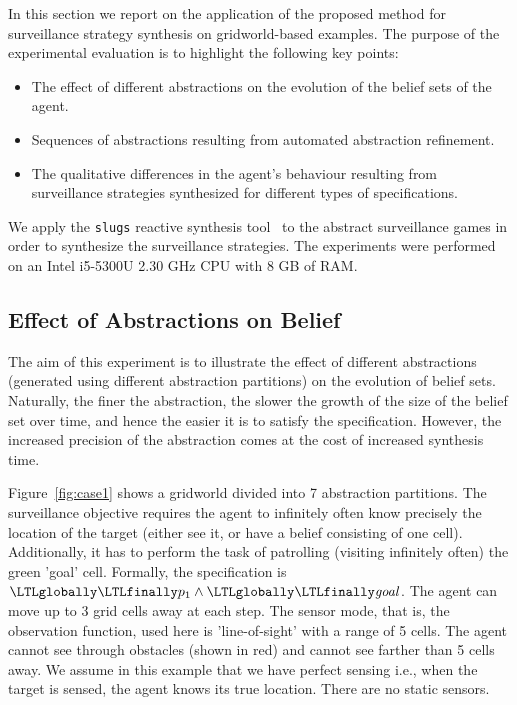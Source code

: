 In this section we report on the application of the proposed method for surveillance strategy synthesis on gridworld-based examples. The purpose of the experimental evaluation is to highlight the following key points:
\begin{itemize}
    \item The effect of different abstractions on the evolution of the belief sets of the agent.
    \item Sequences of abstractions resulting from automated abstraction refinement.
    \item The qualitative differences in the agent's behaviour resulting from surveillance strategies synthesized for different types of specifications.
\end{itemize}


We apply the \texttt{slugs} reactive synthesis tool~\cite{EhlersR16} to the abstract surveillance games in order to synthesize the surveillance strategies. The experiments were performed on an Intel i5-5300U 2.30 GHz CPU with 8 GB of RAM. 

\subsection{Effect of Abstractions on Belief}
The aim of this experiment is to illustrate the effect of different abstractions (generated using different abstraction partitions) on the evolution of belief sets. Naturally, the finer the abstraction, the slower the growth of the size of the belief set over time, and hence the easier it is to satisfy the specification. However, the increased precision of the abstraction comes at the cost of increased synthesis time. 

Figure~\ref{fig:case1} shows a gridworld divided into 7 abstraction partitions. The surveillance objective requires the agent to infinitely often know precisely the location of the target (either see it, or have a belief consisting of one cell). Additionally, it has to perform the task of patrolling (visiting infinitely often) the green 'goal' cell. Formally, the specification is $\LTLglobally\LTLfinally p_1 \wedge \LTLglobally\LTLfinally \mathit{goal}$. The agent can move up to 3 grid cells away at each step. The sensor mode, that is, the observation function, used here is 'line-of-sight' with a range of 5 cells. The agent cannot see through obstacles (shown in red) and cannot see farther than 5 cells away.  We assume in this example that we have perfect sensing i.e., when the target is sensed, the agent knows its true location. There are no static sensors. 


